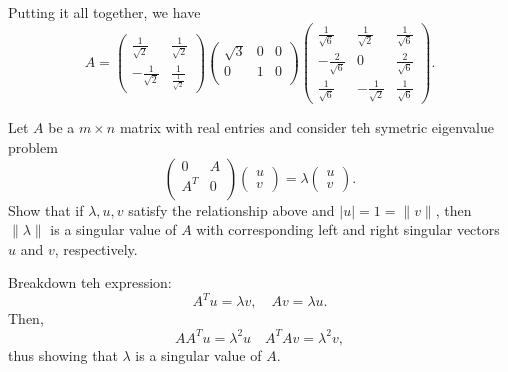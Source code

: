 \documentclass[5pt, a4paper]{article}
\begin{document}
Putting it all together, we have 
\[
A = 
    \begin{pmatrix} 
        \frac{1}{\sqrt{2} } & \frac{1}{\sqrt{2} } \\ 
        -\frac{1}{\sqrt{2} } & \frac{1}{\frac{1}{\sqrt{2} }}     
    \end{pmatrix} 
    \begin{pmatrix} 
        \sqrt{3} & 0 & 0 \\ 
        0 & 1 & 0 \\
    \end{pmatrix} 
\begin{pmatrix} 
    \frac{1}{\sqrt{6} } & \frac{1}{\sqrt{2} } & \frac{1}{\sqrt{6} } \\ 
    -\frac{2}{\sqrt{6} } & 0 & \frac{2}{\sqrt{6} } \\
    \frac{1}{\sqrt{6} } & -\frac{1}{\sqrt{2} } & \frac{1}{\sqrt{6} }    
\end{pmatrix}
.\] 
    
\begin{tcolorbox}[title=Question 6]
    Let $A$ be a  $m\times n$ matrix with real entries and consider teh symetric
    eigenvalue problem \[
    \begin{pmatrix} 
        0 & A \\ 
        A^T & 0 \\
    \end{pmatrix} 
    \begin{pmatrix} u \\ v \end{pmatrix} 
    = \lambda \begin{pmatrix} u \\ v \end{pmatrix} 
    .\] 
    Show that if $\lambda, u, v$ satisfy the relationship above and $|u| = 1 =
    \|v\|$, then $\|\lambda\|$ is a singular value of $A$ with corresponding
    left and right singular vectors $u$ and $v$, respectively.
\end{tcolorbox} 
Breakdown teh expression: 
\[
A^{T}u = \lambda v, \quad Av = \lambda u
.\] 
Then, \[
    A A ^{T} u= \lambda ^2 u \quad A^{T} A v = \lambda ^2 v
,\] 
thus showing that $\lambda$ is a singular value of  $A$.
\end{document}
